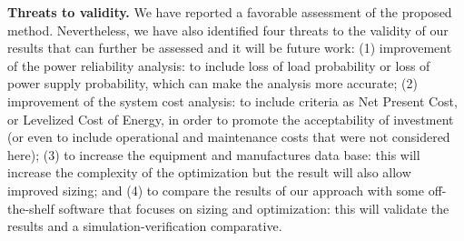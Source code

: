 \documentclass[10pt,conference]{IEEEtran}
\begin{document}
\textbf{Threats to validity.}  We have reported a favorable assessment of the proposed method. Nevertheless, we have also identified four threats to the validity of our results that can further be assessed and it will be future work: (1) improvement of the power reliability analysis: to include loss of load probability or loss of power supply probability, which can make the analysis more accurate; (2) improvement of the system cost analysis: to include criteria as Net Present Cost, or Levelized Cost of Energy, in order to promote the acceptability of investment (or even to include operational and maintenance costs that were not considered here); (3) to increase the equipment and manufactures data base: this will increase the complexity of the optimization but the result will also allow improved sizing; and (4) to compare the results of our approach with some off-the-shelf software that focuses on sizing and optimization: this will validate the results and a simulation-verification comparative.
%
{}

\vspace{12pt}
\end{document}
